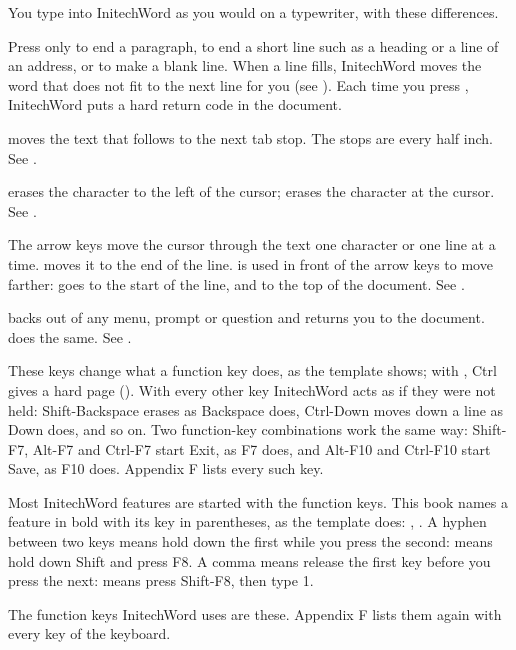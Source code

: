 You type into InitechWord as you would on a typewriter, with these
differences.

Press  only to end a paragraph, to end a short line such as a
heading or a line of an address, or to make a blank line.  When a line
fills, InitechWord moves the word that does not fit to the next line for
you (see ).  Each time you press , InitechWord
puts a hard return code in the document.

 moves the text that follows to the next tab stop.  The stops are
every half inch.  See .

 erases the character to the left of the cursor; 
erases the character at the cursor.  See .

The arrow keys move the cursor through the text one character or one line
at a time.   moves it to the end of the line.   is used in
front of the arrow keys to move farther:  goes to the start
of the line, and  to the top of the document.  See
.

 backs out of any menu, prompt or question and returns you
to the document.   does the same.  See .

These keys change what a function key does, as the template shows; with
, Ctrl gives a hard page ().  With every other key
InitechWord acts as if they were not held: Shift-Backspace erases as
Backspace does, Ctrl-Down moves down a line as Down does, and so on.  Two
function-key combinations work the same way: Shift-F7, Alt-F7 and Ctrl-F7
start Exit, as F7 does, and Alt-F10 and Ctrl-F10 start Save, as F10 does.
Appendix F lists every such key.

Most InitechWord features are started with the function keys.  This book
names a feature in bold with its key in parentheses, as the template does:
, .  A hyphen between two keys means hold
down the first while you press the second:  means hold down
Shift and press F8.  A comma means release the first key before you press
the next:  means press Shift-F8, then type 1.

The function keys InitechWord uses are these.  Appendix F lists them again
with every key of the keyboard.

